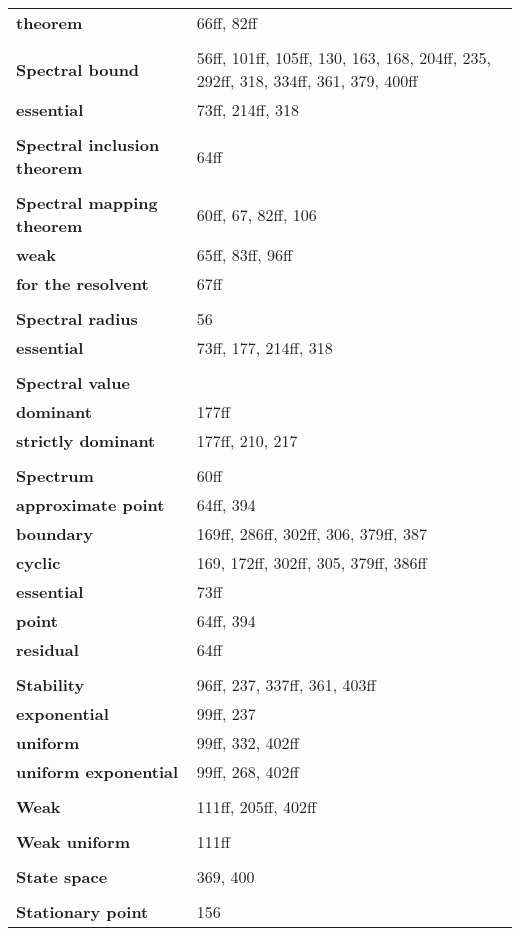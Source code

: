 \documentclass[10pt]{scrartcl}
\begin{document}
\begin{longtable}{>{\bfseries}p{6cm}p{8cm}}
\quad theorem & 66ff, 82ff \\
\\
\textbf{Spectral bound} & 56ff, 101ff, 105ff, 130, 163, 168, 204ff, 235, 292ff, 318, 334ff, 361, 379, 400ff \\
\quad essential & 73ff, 214ff, 318 \\
\\
\textbf{Spectral inclusion theorem} & 64ff \\
\\
\textbf{Spectral mapping theorem} & 60ff, 67, 82ff, 106 \\
\quad weak & 65ff, 83ff, 96ff \\
\quad for the resolvent & 67ff \\
\\
\textbf{Spectral radius} & 56 \\
\quad essential & 73ff, 177, 214ff, 318 \\
\\
\textbf{Spectral value} & \\
\quad dominant & 177ff \\
\quad strictly dominant & 177ff, 210, 217 \\
\\
\textbf{Spectrum} & 60ff \\
\quad approximate point & 64ff, 394 \\
\quad boundary & 169ff, 286ff, 302ff, 306, 379ff, 387 \\
\quad cyclic & 169, 172ff, 302ff, 305, 379ff, 386ff \\
\quad essential & 73ff \\
\quad point & 64ff, 394 \\
\quad residual & 64ff \\
\\
\textbf{Stability} & 96ff, 237, 337ff, 361, 403ff \\
\quad exponential & 99ff, 237 \\
\quad uniform & 99ff, 332, 402ff \\
\quad uniform exponential & 99ff, 268, 402ff \\
\\
\textbf{Weak} & 111ff, 205ff, 402ff \\
\\
\textbf{Weak uniform} & 111ff \\
\\
\textbf{State space} & 369, 400 \\
\\
\textbf{Stationary point} & 156 \\

\end{longtable}
\end{document}
